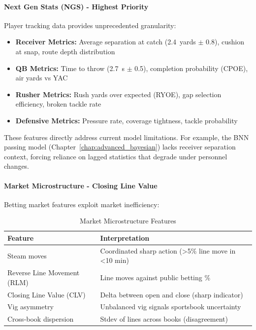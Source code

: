 \paragraph{Next Gen Stats (NGS) - Highest Priority}

Player tracking data provides unprecedented granularity:

\begin{itemize}
    \item \textbf{Receiver Metrics:} Average separation at catch (\SI{2.4}{yards} $\pm$ \SI{0.8}{}), cushion at snap, route depth distribution
    \item \textbf{QB Metrics:} Time to throw (\SI{2.7}{s} $\pm$ \SI{0.5}{}), completion probability (CPOE), air yards vs YAC
    \item \textbf{Rusher Metrics:} Rush yards over expected (RYOE), gap selection efficiency, broken tackle rate
    \item \textbf{Defensive Metrics:} Pressure rate, coverage tightness, tackle probability
\end{itemize}

These features directly address current model limitations. For example, the BNN passing model (Chapter~\ref{chap:advanced_bayesian}) lacks receiver separation context, forcing reliance on lagged statistics that degrade under personnel changes.

\paragraph{Market Microstructure - Closing Line Value}

Betting market features exploit market inefficiency:

\begin{table}[htbp]
\centering
\caption{Market Microstructure Features}
\label{tab:market_features}
\begin{tabular}{@{}lp{7cm}@{}}
\toprule
\textbf{Feature} & \textbf{Interpretation} \\
\midrule
Steam moves & Coordinated sharp action (>5\% line move in <10 min) \\
Reverse Line Movement (RLM) & Line moves against public betting \% \\
Closing Line Value (CLV) & Delta between open and close (sharp indicator) \\
Vig asymmetry & Unbalanced vig signals sportsbook uncertainty \\
Cross-book dispersion & Stdev of lines across books (disagreement) \\
\bottomrule
\end{tabular}
\end{table}

